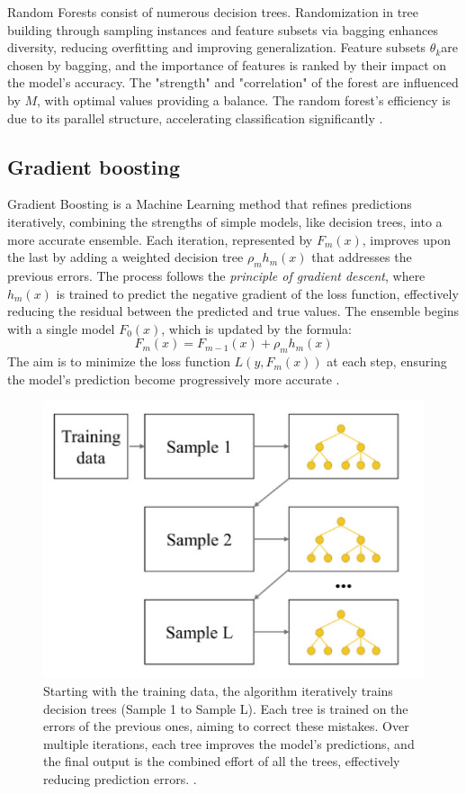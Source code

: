             Random Forests consist of numerous decision trees. Randomization in tree building through sampling instances and feature subsets via bagging enhances diversity, reducing overfitting and improving generalization. Feature subsets $\theta_k$​ are chosen by bagging, and the importance of features is ranked by their impact on the model's accuracy. The "strength" and "correlation" of the forest are influenced by $M$, with optimal values providing a balance. The random forest's efficiency is due to its parallel structure, accelerating classification significantly \cite{parmar_review_2019}.
            
        \subsection{Gradient boosting}
            Gradient Boosting is a Machine Learning method that refines predictions iteratively, combining the strengths of simple models, like decision trees, into a more accurate ensemble. Each iteration, represented by $F_m(x)$, improves upon the last by adding a weighted decision tree $\rho_m h_m(x)$ that addresses the previous errors. The process follows the \textit{principle of gradient descent}, where $h_m(x)$ is trained to predict the negative gradient of the loss function, effectively reducing the residual between the predicted and true values. The ensemble begins with a single model $F_0(x)$, which is updated by the formula:
            \begin{equation}
                F_m(x) = F_{m-1}(x) + \rho_m h_m(x)
            \end{equation}
            The aim is to minimize the loss function $L(y, F_m(x))$ at each step, ensuring the model's prediction become progressively more accurate \cite{bentejac_comparative_2021}.
            \begin{figure}[H]
                \centering
                \includegraphics[width=.5\textwidth]{../src/resources/images/models/boosting.png}
                \caption{
                    Starting with the training data, the algorithm iteratively trains decision trees (Sample 1 to Sample L). Each tree is trained on the errors of the previous ones, aiming to correct these mistakes. Over multiple iterations, each tree improves the model's predictions, and the final output is the combined effort of all the trees, effectively reducing prediction errors. \cite{cha_comparison_2021}.
                }
                \label{fig:gradient_boosting}
            \end{figure}

